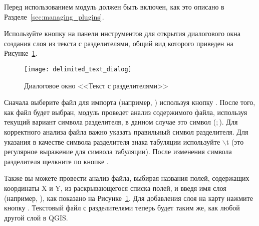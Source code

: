 Перед использованием модуль должен быть включен, как это описано в
Разделе~\ref{sec:managing_plugins}.

Используйте кнопку 
на панели инструментов для открытия диалогового окна создания слоя из
текста с разделителями, общий вид которого приведен на Рисунке~\ref{fig:delim_text_plugin_dialog}.

\begin{figure}[ht]
   \centering
   \texttt{[image: delimited\_text\_dialog]}
   \caption{Диалоговое окно <<Текст с разделителями>> \wincaption}\label{fig:delim_text_plugin_dialog}
\end{figure}

Сначала выберите файл для импорта (например, )
используя кнопку . После того, как файл будет выбран, модуль
проведет анализ содержимого файла, используя текущий вариант символа
разделителя, в данном случае это символ (\mbox{$;$}). Для корректного
анализа файла важно указать правильный символ разделителя. Для указания
в качестве символа разделителя знака табуляции используйте
\mbox{$\backslash$}t (это регулярное выражение для символа табуляции).
После изменения символа разделителя щелкните по кнопке .

Также вы можете провести анализ файла, выбирая названия полей, содержащих
координаты X и Y, из раскрывающегося списка полей, и введя имя слоя
(например, ), как показано на Рисунке~\ref{fig:delim_text_plugin_dialog}.
Для добавления слоя на карту нажмите кнопку . Текстовый файл
с разделителями теперь будет таким же, как любой другой слой в QGIS.

\FloatBarrier
